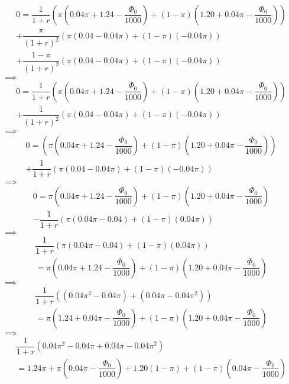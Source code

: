 \documentclass{article}
\begin{document}
\begin{multline*}
    0=\dfrac{1}{1+r}\left(\pi\left(0.04\pi+1.24-\dfrac{\Phi_{0}}{1000}\right)+\left(1-\pi\right)\left(1.20+0.04\pi-\dfrac{\Phi_{0}}{1000}\right)\right)\\
    +\dfrac{\pi}{\left(1+r\right)^{2}}\left(\pi\left(0.04-0.04\pi\right)+\left(1-\pi\right)\left(-0.04\pi\right)\right)\\
    +\dfrac{1-\pi}{\left(1+r\right)^{2}}\left(\pi\left(0.04-0.04\pi\right)+\left(1-\pi\right)\left(-0.04\pi\right)\right)
\end{multline*}
$\implies$
\begin{multline*}
    0=\dfrac{1}{1+r}\left(\pi\left(0.04\pi+1.24-\dfrac{\Phi_{0}}{1000}\right)+\left(1-\pi\right)\left(1.20+0.04\pi-\dfrac{\Phi_{0}}{1000}\right)\right)\\
    +\dfrac{1}{\left(1+r\right)^{2}}\left(\pi\left(0.04-0.04\pi\right)+\left(1-\pi\right)\left(-0.04\pi\right)\right)
\end{multline*}
$\implies$
\begin{multline*}
    0=\left(\pi\left(0.04\pi+1.24-\dfrac{\Phi_{0}}{1000}\right)+\left(1-\pi\right)\left(1.20+0.04\pi-\dfrac{\Phi_{0}}{1000}\right)\right)\\
    +\dfrac{1}{1+r}\left(\pi\left(0.04-0.04\pi\right)+\left(1-\pi\right)\left(-0.04\pi\right)\right)
\end{multline*}
$\implies$
\begin{multline*}
    0=\pi\left(0.04\pi+1.24-\dfrac{\Phi_{0}}{1000}\right)+\left(1-\pi\right)\left(1.20+0.04\pi-\dfrac{\Phi_{0}}{1000}\right)\\
    -\dfrac{1}{1+r}\left(\pi\left(0.04\pi-0.04\right)+\left(1-\pi\right)\left(0.04\pi\right)\right)
\end{multline*}
$\implies$
\begin{multline*}
    \dfrac{1}{1+r}\left(\pi\left(0.04\pi-0.04\right)+\left(1-\pi\right)\left(0.04\pi\right)\right)\\
    =\pi\left(0.04\pi+1.24-\dfrac{\Phi_{0}}{1000}\right)+\left(1-\pi\right)\left(1.20+0.04\pi-\dfrac{\Phi_{0}}{1000}\right)
\end{multline*}
$\implies$
\begin{multline*}
    \dfrac{1}{1+r}\left(\left(0.04\pi^{2}-0.04\pi\right)+\left(0.04\pi-0.04\pi^{2}\right)\right)\\
    =\pi\left(1.24+0.04\pi-\dfrac{\Phi_{0}}{1000}\right)+\left(1-\pi\right)\left(1.20+0.04\pi-\dfrac{\Phi_{0}}{1000}\right)
\end{multline*}
$\implies$
\begin{multline*}
    \dfrac{1}{1+r}\left(0.04\pi^{2}-0.04\pi+0.04\pi-0.04\pi^{2}\right)\\
    =1.24\pi+\pi\left(0.04\pi-\dfrac{\Phi_{0}}{1000}\right)+1.20\left(1-\pi\right)+\left(1-\pi\right)\left(0.04\pi-\dfrac{\Phi_{0}}{1000}\right)
\end{multline*}
\end{document}
